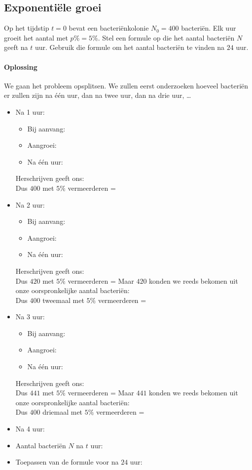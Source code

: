 \documentclass[12pt,twoside]{article}
\begin{document}
\subsection{Exponentiële groei}

\begin{oefening}
Op het tijdstip $t=0$ bevat een bacteriënkolonie $N_0=400$ bacteriën. Elk uur groeit het aantal met $p\%=5\%$. Stel een formule op die het aantal bacteriën $N$ geeft na $t$ uur. Gebruik die formule om het aantal bacteriën te vinden na $24$ uur.
\end{oefening}

\paragraph*{Oplossing}
We gaan het probleem opsplitsen. We zullen eerst onderzoeken hoeveel bacteriën er zullen zijn na één uur, dan na twee uur, dan na drie uur, \ldots

\begin{itemize}
  \item Na 1 uur:
  \begin{itemize}
    \item Bij aanvang: \arule{4cm}
    \item Aangroei: \arule{4cm}
    \item Na één uur: \arule{4cm}
  \end{itemize}
  Herschrijven geeft ons: \\
  Dus $400$ met $5\%$ vermeerderen = \arulefill
  \item Na 2 uur:
  \begin{itemize}
    \item Bij aanvang: \arule{4cm}
    \item Aangroei: \arule{4cm}
    \item Na één uur: \arule{4cm}
  \end{itemize}
  Herschrijven geeft ons: \\
  Dus $420$ met $5\%$ vermeerderen = \arulefill
  Maar $420$ konden we reeds bekomen uit onze oorspronkelijke aantal bacteriën: \\
  Dus $400$ tweemaal met $5\%$ vermeerderen = \arulefill
  \item Na 3 uur:
  \begin{itemize}
    \item Bij aanvang: \arule{4cm}
    \item Aangroei: \arule{4cm}
    \item Na één uur: \arule{4cm}
  \end{itemize}
  Herschrijven geeft ons: \\
  Dus $441$ met $5\%$ vermeerderen = \arulefill
  Maar $441$ konden we reeds bekomen uit onze oorspronkelijke aantal bacteriën: \\
  Dus $400$ driemaal met $5\%$ vermeerderen = \arulefill
  \item Na 4 uur: \arulefill
  \item Aantal bacteriën $N$ na $t$ uur: \arulefill
  \item Toepassen van de formule voor na $24$ uur: \arulefill
\end{itemize}
\end{document}
